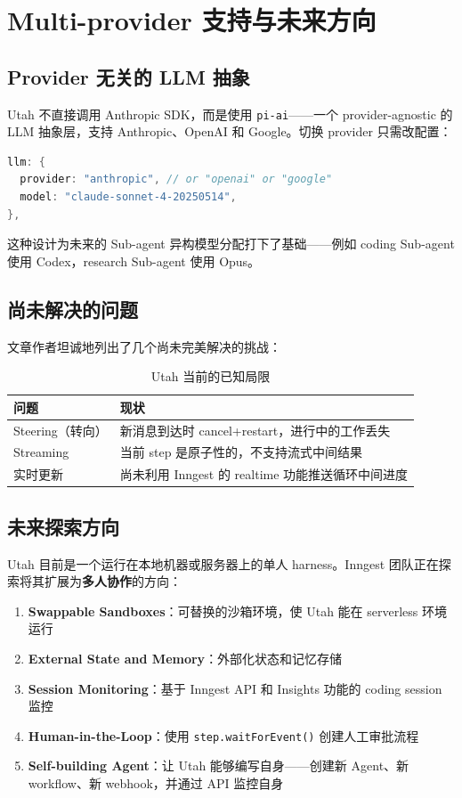 \section{Multi-provider 支持与未来方向}

\subsection{Provider 无关的 LLM 抽象}

Utah 不直接调用 Anthropic SDK，而是使用 \texttt{pi-ai}——一个 provider-agnostic 的 LLM 抽象层，支持 Anthropic、OpenAI 和 Google。切换 provider 只需改配置：

\begin{lstlisting}[caption={LLM Provider 配置},language=Java]
llm: {
  provider: "anthropic", // or "openai" or "google"
  model: "claude-sonnet-4-20250514",
},
\end{lstlisting}

这种设计为未来的 Sub-agent 异构模型分配打下了基础——例如 coding Sub-agent 使用 Codex，research Sub-agent 使用 Opus。

\subsection{尚未解决的问题}

文章作者坦诚地列出了几个尚未完美解决的挑战：

\begin{table}[H]
\centering
\caption{Utah 当前的已知局限}
\begin{tabular}{lp{9cm}}
\toprule
\textbf{问题} & \textbf{现状} \\
\midrule
Steering（转向） & 新消息到达时 cancel+restart，进行中的工作丢失 \\
Streaming & 当前 step 是原子性的，不支持流式中间结果 \\
实时更新 & 尚未利用 Inngest 的 realtime 功能推送循环中间进度 \\
\bottomrule
\end{tabular}
\end{table}

\subsection{未来探索方向}

Utah 目前是一个运行在本地机器或服务器上的单人 harness。Inngest 团队正在探索将其扩展为\textbf{多人协作}的方向：

\begin{enumerate}
    \item \textbf{Swappable Sandboxes}：可替换的沙箱环境，使 Utah 能在 serverless 环境运行
    \item \textbf{External State and Memory}：外部化状态和记忆存储
    \item \textbf{Session Monitoring}：基于 Inngest API 和 Insights 功能的 coding session 监控
    \item \textbf{Human-in-the-Loop}：使用 \texttt{step.waitForEvent()} 创建人工审批流程
    \item \textbf{Self-building Agent}：让 Utah 能够编写自身——创建新 Agent、新 workflow、新 webhook，并通过 API 监控自身
\end{enumerate}


